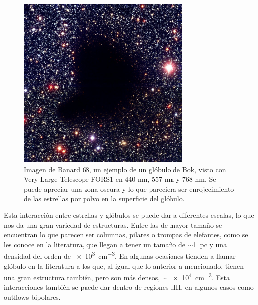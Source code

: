 \documentclass{article}
\begin{document}
\begin{figure}[h]
    \centering
    \includegraphics[width=0.75\textwidth]{images Chapter 1/C1_Bok_globule.jpg}
    \caption{Imagen de Banard 68, un ejemplo de un glóbulo de Bok, visto con Very Large Telescope FORS1 en 440 nm, 557 nm y 768 nm. Se puede apreciar una zona oscura y lo que pareciera ser enrojecimiento de las estrellas por polvo en la superficie del glóbulo.}
    \label{fig:zones}
\end{figure}

Esta interacción entre estrellas y glóbulos se puede dar a diferentes escalas, lo que nos da una gran variedad de estructuras. Entre las de mayor tamaño se encuentran lo que parecen ser columnas, pilares o trompas de elefantes, como se les conoce en la literatura, que llegan a tener un tamaño de $\sim$\SI{1}{pc} y una densidad del orden de \SI{e3}{cm^{-3}}. En algunas ocasiones tienden a llamar glóbulo en la literatura a los que, al igual que lo anterior a mencionado, tienen una gran estructura también, pero son más densos, $\sim$ \SI{e4}{cm^{-3}}. Esta interacciones también se puede dar dentro de regiones HII, en algunos casos como outflows bipolares.
\end{document}
